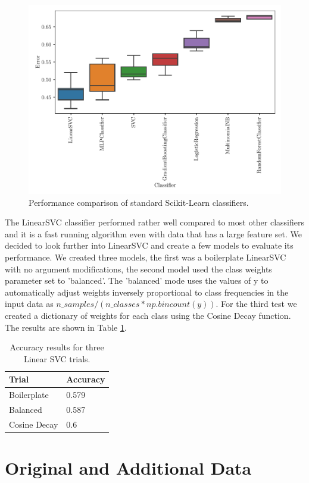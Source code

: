 \begin{figure}[ht]
  \centering
  \includegraphics[width=\textwidth]{../img/plot_explore_classifiers.pdf}
  \caption{Performance comparison of standard Scikit-Learn classifiers.}
  \label{fig:explore_classifiers}
\end{figure}

The LinearSVC classifier performed rather well compared to most other classifiers and it is a fast running algorithm even with data that has a large feature set. We decided to look further into LinearSVC and create a few models to evaluate its performance. We created three models, the first was a boilerplate LinearSVC with no argument modifications, the second model used the class weights parameter set to 'balanced'. The 'balanced' mode uses the values of y to automatically adjust weights inversely proportional to class frequencies in the input data as $n\_samples / (n\_classes * np.bincount(y))$. For the third test we created a dictionary of weights for each class using the Cosine Decay function. The results are shown in Table \ref{tab:lsvc_models}.


\begin{table}[h]
\centering
\begin{tabular}{|l|l|}
\hline
\textbf{Trial} & \textbf{Accuracy} \\
\hline
Boilerplate & 0.579 \\
\hline
Balanced & 0.587 \\
\hline
Cosine Decay & 0.6 \\
\hline
\end{tabular}
\caption{Accuracy results for three Linear SVC trials.}
\label{tab:lsvc_models}
\end{table}


\section{Original and Additional Data}